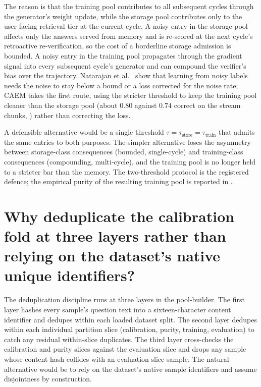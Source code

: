 The reason is that the training pool contributes to all subsequent cycles through the generator's weight update, while the storage pool contributes only to the user-facing retrieval tier at the current cycle. A noisy entry in the storage pool affects only the answers served from memory and is re-scored at the next cycle's retroactive re-verification, so the cost of a borderline storage admission is bounded. A noisy entry in the training pool propagates through the gradient signal into every subsequent cycle's generator and can compound the verifier's bias over the trajectory. Natarajan et al.~\cite{natarajan2013learning} show that learning from noisy labels needs the noise to stay below a bound or a loss corrected for the noise rate; CAEM takes the first route, using the stricter threshold to keep the training pool cleaner than the storage pool (about $0.80$ against $0.74$ correct on the stream chunks, ) rather than correcting the loss.

A defensible alternative would be a single threshold $\tau = \tau_{\text{store}} = \tau_{\text{train}}$ that admits the same entries to both purposes. The simpler alternative loses the asymmetry between storage-class consequences (bounded, single-cycle) and training-class consequences (compounding, multi-cycle), and the training pool is no longer held to a stricter bar than the memory. The two-threshold protocol is the registered defence; the empirical purity of the resulting training pool is reported in .


\section[Three-layer dedup]{Why deduplicate the calibration fold at three layers rather than relying on the dataset's native unique identifiers?}
\label{app:qa-three-layer-dedup}

The deduplication discipline runs at three layers in the pool-builder. The first layer hashes every sample's question text into a sixteen-character content identifier and dedupes within each loaded dataset split. The second layer dedupes within each individual partition slice (calibration, purity, training, evaluation) to catch any residual within-slice duplicates. The third layer cross-checks the calibration and purity slices against the evaluation slice and drops any sample whose content hash collides with an evaluation-slice sample. The natural alternative would be to rely on the dataset's native sample identifiers and assume disjointness by construction.

